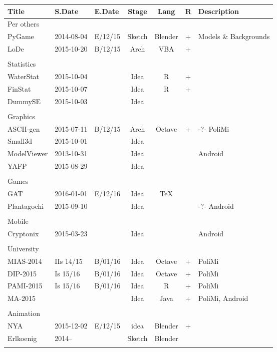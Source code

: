 \documentclass[a4paper,12pt]{article} %
\begin{document}
	
\begin{tabularx}{\textwidth}{|l|l|l|c|c|c|X|}
	\hline
	Title & S.Date & E.Date & Stage & Lang & R & Description \\
	\hline
	Per others &  &  &  &  &  &  \\
	\hline
	PyGame & 2014-08-04 & E/12/15 & Sketch & Blender & + & Models \& Backgrounds \\
	\hline
	LoDe & 2015-10-20 & B/12/15 & Arch & VBA & + &  \\
	\hline
	&  &  &  &  &  &  \\
	\hline
	Statistics &  &  &  &  &  &  \\
	\hline
	WaterStat & 2015-10-04 &  & Idea & R & + &  \\
	\hline
	FinStat & 2015-10-07 &  & Idea & R & + &  \\
	\hline
	DummySE & 2015-10-03 &  & Idea &  &  &  \\
	\hline
	&  &  &  &  &  &  \\
	\hline
	Graphics &  &  &  &  &  &  \\
	\hline
	ASCII-gen & 2015-07-11 & B/12/15 & Arch & Octave & + & -?- PoliMi \\
	\hline
	Small3d & 2015-10-01 &  & Idea &  &  &  \\
	\hline
	ModelViewer & 2013-10-31 &  & Idea &  &  & Android \\
	\hline
	YAFP & 2015-08-29 &  & Idea &  &  &  \\
	\hline
	&  &  &  &  &  &  \\
	\hline
	Games &  &  &  &  &  &  \\
	\hline
	GAT & 2016-01-01 & E/12/16 & Idea & \TeX &  &  \\
	\hline
	Plantagochi & 2015-09-10 &  & Idea &  &  & -?- Android \\
	\hline
	&  &  &  &  &  &  \\
	\hline
	Mobile &  &  &  &  &  &  \\
	\hline
	Cryptonix & 2015-03-23 &  & Idea &  &  & Android \\
	\hline
	&  &  &  &  &  &  \\
	\hline
	University &  &  &  &  &  &  \\
	\hline
	MIAS-2014 & IIs 14/15 & B/01/16 & Idea & Octave & + & PoliMi \\
	\hline
	DIP-2015 & Is 15/16 & B/01/16 & Idea & Octave & + & PoliMi \\
	\hline
	PAMI-2015 & Is 15/16 & B/01/16 & Idea & R & + & PoliMi \\
	\hline
	MA-2015 &  &  & Idea & Java & + & PoliMi, Android \\
	\hline
	&  &  &  &  &  &  \\
	\hline
	Animation &  &  &  &  &  &  \\
	\hline
	NYA & 2015-12-02 & E/12/15 & idea & Blender & + &  \\
	\hline
	Erlkoenig & 2014-- &  & Sketch & Blender &  &  \\
	\hline
	&  &  &  &  &  &  \\
	\hline
\end{tabularx}

\end{document}
